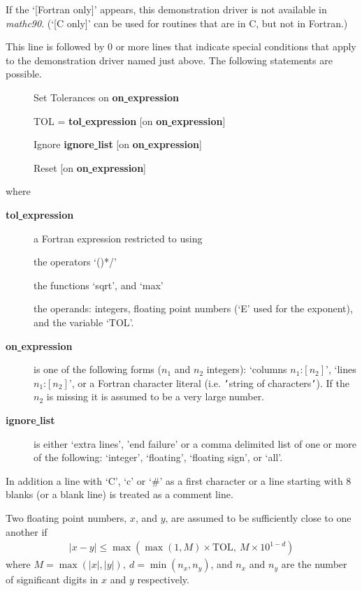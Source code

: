\documentclass[twoside]{MATH77}
\begin{document}
If the `[Fortran only]' appears, this demonstration driver is not
available in {\em mathc90}.  (`[C only]' can be used for routines that
are in C, but not in Fortran.)

This line is followed by 0 or more lines that indicate special conditions
that apply to the demonstration driver named just above.  The following
statements are possible.
\vspace{-10pt}
\begin{description}
\item[ ]Set Tolerances on {\bf on\underline{ }expression}
\item[ ]TOL = {\bf tol\underline{ }expression}
[on {\bf on\underline{ }expression}]
\item[ ]Ignore {\bf ignore\underline{ }list}
[on {\bf on\underline{ }expression}]
\item[ ]Reset [on {\bf on\underline{ }expression}]
\end{description}
where
\vspace{-10pt}
\begin{description}
\item[\bf tol\underline{ }expression] a Fortran expression restricted to
using
\item[ ]the operators `()*/'
\item[ ]the functions `sqrt', and `max'
\item[ ]the operands: integers, floating point numbers (`E' used for the
exponent), and the variable `TOL'.
\item[\bf on\underline{ }expression] is one of the following forms ($n_1$
and $n_2$ integers): `columns $n_1$:$[n_2]$', `lines $n_1$:$[n_2]$', or
a Fortran character literal (i.e. {\tt '}string of characters{\tt '}).  If
the $n_2$ is missing it is assumed to be a very large number.
\item[\bf ignore\underline{ }list] is either `extra lines', 'end failure' or a
  comma delimited list of one or more of the following: `integer', `floating',
  `floating sign', or `all'.
 \end{description}

In addition a line with `C', `c' or `\#' as a first character or a line starting
with 8 blanks (or a blank line) is treated as a comment line.

Two floating point numbers, $x$, and $y$, are assumed to be sufficiently
close to one another if
\begin{multline*}
    |x-y| \leq \max(\max(1, M)\times \text{TOL},\ M \times 10^{1-d})
\end{multline*}
where $M = \max(|x|, |y|),\ d = \min(n_x, n_y)$, and $n_x$ and $n_y$ are
the number of significant digits in $x$ and $y$ respectively.
\end{document}
